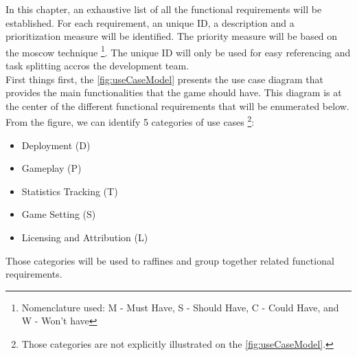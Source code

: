 
In this chapter, an exhaustive list of all the functional requirements will be established. For each requirement, an unique ID, a description and a prioritization measure will be identified. The priority measure will be based on the \gls{moscow} technique \cite{brennan2009} \footnote{Nomenclature used: M - Must Have, S - Should Have, C - Could Have, and W - Won't have}. The unique ID will only be used for easy referencing and task splitting accros the development team. \\

First things first, the \autoref{fig:useCaseModel} presents the use case diagram that provides the main functionalities that the game should have. This diagram is at the center of the different functional requirements that will be enumerated below. From the figure, we can identify 5 categories of use cases \footnote{Those categories are not explicitly illustrated on the \autoref{fig:useCaseModel}.}:
\begin{itemize}
  \item Deployment (D)
  \item Gameplay (P)
  \item Statistics Tracking (T)
  \item Game Setting (S)
  \item Licensing and Attribution (L)
\end{itemize}
Those categories will be used to raffines and group together related functional requirements.

